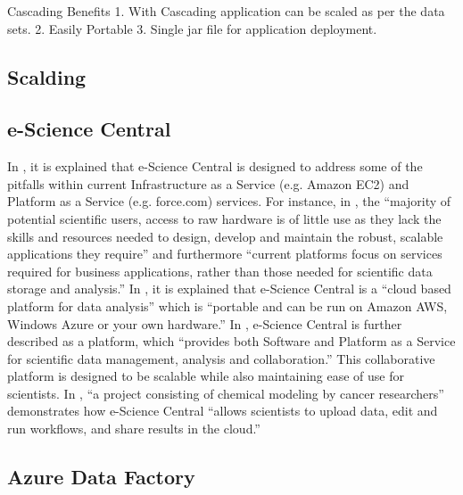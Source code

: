     Cascading Benefits
    1. With Cascading application can be scaled as per the data sets.
    2. Easily Portable
    3. Single jar file for application deployment.

\subsection{Scalding}
\subsection{e-Science Central}

    In \cite{e-science-central-paper-2010}, it is explained that
    e-Science Central is designed to address some of the pitfalls
    within current Infrastructure as a Service (e.g.  Amazon EC2) and
    Platform as a Service (e.g. force.com) services. For instance, in
    \cite{e-science-central-paper-2010}, the ``majority of potential
    scientific users, access to raw hardware is of little use as they
    lack the skills and resources needed to design, develop and
    maintain the robust, scalable applications they require'' and
    furthermore ``current platforms focus on services required for
    business applications, rather than those needed for scientific
    data storage and analysis.'' In \cite{www-e-science-central}, it
    is explained that e-Science Central is a ``cloud based platform for
    data analysis'' which is ``portable and can be run on Amazon AWS,
    Windows Azure or your own hardware.'' In
    \cite{e-science-central-paper-2010}, e-Science Central is further
    described as a platform, which ``provides both Software and
    Platform as a Service for scientific data management, analysis and
    collaboration.'' This collaborative platform is designed to be
    scalable while also maintaining ease of use for scientists. In
    \cite{e-science-central-paper-2010}, ``a project consisting of
    chemical modeling by cancer researchers'' demonstrates how
    e-Science Central ``allows scientists to upload data, edit and run
    workflows, and share results in the cloud.''

\subsection{Azure Data Factory}
    
